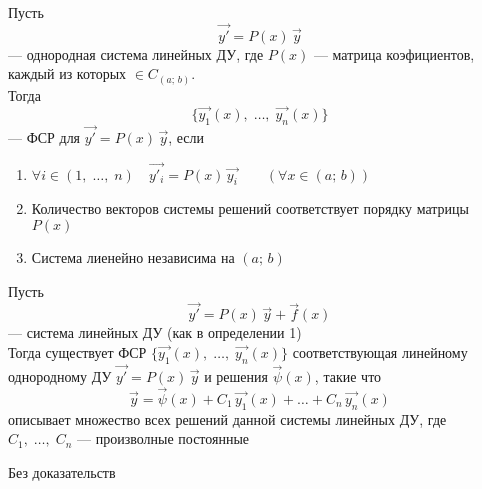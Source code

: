\begin{Def}
    Пусть 
    \[
        \vec{y'} = P(x)\,\vec{y}
    \]
    --- однородная система линейных ДУ, где $P(x)$ --- матрица коэфициентов, каждый из которых $\in C_(a;\,b)$.\\
    
    Тогда 
    \[
        \{\vec{y_1}(x),\; \dots,\; \vec{y_n}(x)\}
    \]
    --- ФСР для  $\vec{y'} = P(x)\,\vec{y}$, если
    \begin{enumerate}
        \item $\forall i \in (1,\; \dots,\; n) \quad \vec{y'_i} = P(x)\,\vec{y_i} \qquad (\forall x \in (a;\,b))$ 
        
        \item Количество векторов системы решений соответствует порядку матрицы $P(x)$
        
        \item Система лиенейно независима на $(a;\,b)$
    \end{enumerate}
\end{Def}

\begin{Th}
    Пусть
    \[
        \vec{y'} = P(x)\,\vec{y} + \vec{f}(x)
    \]
    --- система линейных ДУ (как в определении 1)\\
    
    Тогда существует ФСР $\{\vec{y_1}(x),\; \dots,\; \vec{y_n}(x)\}$ соответствующая линейному однородному ДУ $\vec{y'} = P(x)\,\vec{y}$ и решения $\vec{\psi}(x)$, такие что 
    \[
        \vec{y} = \vec{\psi}(x) + C_1\,\vec{y_1}(x) + \dots + C_n\,\vec{y_n}(x)
    \]
    описывает множество всех решений данной системы линейных ДУ, где $C_1,\; \dots,\; C_n$ --- произволные постоянные
\end{Th}

\begin{Proof}
    Без доказательств
\end{Proof}






